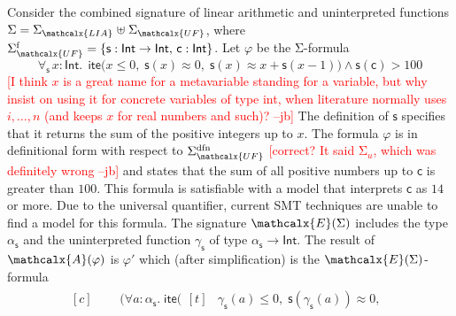 \documentclass[runningheads,a4paper]{llncs}
\newcommand{\con}[1]{\mathsf{#1}}
\let\const=\con
\let\oldSigma=\Sigma
\def\Sigma{\mathrm{\oldSigma}}
\let\oldwedge=\wedge
\def\wedge{\mathrel{\oldwedge}}
\newcommand{\teq}{\approx}
\newcommand{\conv}{\mathcalx{A}}
\newcommand{\stypes}[1]{#1^\mathrm{ty}}
\newcommand{\sfuns}[1]{#1^\mathrm{f}}
\newcommand{\sfundefs}[1]{#1^\mathrm{dfn}}
\newcommand{\typeint}{\ty{Int}}
\newcommand\ty[1]{\con{#1}}
\newcommand{\lite}{\con{ite}}
\newcommand\concret{\gamma} %
\newcommand{\forallf}[1]{\forall_{\!#1\:}}
\newcommand{\farg}[1]{\concret_{#1}}
\newcommand{\fargtype}[1]{\alpha_{#1}}
\newcommand{\Sigmalia}{\Sigma_{\mathcalx{LIA}}}
\newcommand{\extendsig}[1]{\mathcalx{E}( #1 )}
\newcommand{\rem}[1]{\textcolor{red}{[#1]}}
\newcommand{\jb}[1]{\rem{#1 --jb}}
\newcommand{\ct}[1]{\rem{#1 --ct}}
\newcommand{\euf}{\ensuremath{\mathcalx{UF}}\xspace}
\begin{document}
\begin{example}
\label{ex:translation}
Consider the combined signature of linear arithmetic and uninterpreted
functions $\Sigma = \Sigmalia \mathrel{\uplus} \Sigma_{\euf}$, where
$\sfuns{\Sigma_{\euf}} = \{ \con{s} : { \typeint \rightarrow \typeint },\, \const{c} : { \typeint } \}$.
Let $\varphi$ be the $\Sigma$-formula
\begin{equation} \label{eq:ex-before}
\forallf{\con{s}} x : {\typeint}.\;\, \lite\bigl( x \leq 0,\; \con{s}(x) \teq 0,\;
  \con{s}( x ) \teq x + \con{s}( x - 1 ) \bigr) \wedge \con{s}( \con{c} ) > 100
\end{equation}
%
\jb{I think $x$ is a great name for a metavariable standing for a variable, but
why insist on using it for concrete variables of type int, when literature
normally uses $i, \ldots, n$ (and keeps $x$ for real numbers and such)?}
The definition of $\const{s}$ specifies that it returns the sum of the
positive integers up to $x$. The formula $\varphi$ is in definitional form with
respect to $\sfundefs{\Sigma_{\euf}}$ \jb{correct? It said $\Sigma_u$, which was
definitely wrong} and states that the sum of all
positive numbers up to $\const{c}$ is greater than $100$. This formula is
satisfiable with a model that interprets $\const{c}$ as $14$ or more.
Due to the universal quantifier,
current SMT techniques
are unable to find
a model for this formula. The signature $\extendsig{\Sigma}$ includes the type
$\fargtype{\con{s}}$ and the uninterpreted function $\farg{\con{s}}$ of type $\fargtype{\con{s}}
\rightarrow \typeint$. The result of $\conv( \varphi )$ 
is $\varphi'$ which (after simplification) is the $\extendsig{\Sigma}$-formula
%
\begin{equation} \label{eq:ex-after}
\!\begin{aligned}[c]
  & \phantom{{\wedge}\; }\bigl(
      \forall a : \fargtype{\con{s}}.\; \lite\bigl(
        \!\begin{aligned}[t]
         &  \farg{\con{s}}( a ) \leq 0,\;
          \con{s}(\farg{\con{s}}( a )) \teq 0,\;

\end{aligned}
\end{aligned}
\end{equation}
\end{example}
\end{document}
